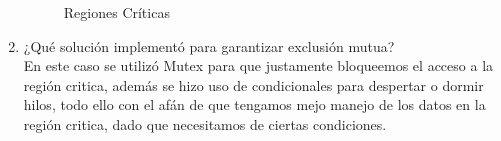 \documentclass[10pt]{article}
\begin{document}
\begin{enumerate}
\begin{figure}[h!]
			\caption{Regiones Críticas}
			\label{fig:p1}
		\end{figure}
		\item ¿Qué solución implementó para garantizar exclusión mutua?
		 \\En este caso se utilizó Mutex para que justamente bloqueemos el acceso a la región critica, además se hizo uso de condicionales para despertar o dormir hilos, todo ello con el afán de que tengamos mejo manejo de los datos en la región critica, dado que necesitamos de ciertas condiciones. 
		\end{enumerate}
	
\end{document}

